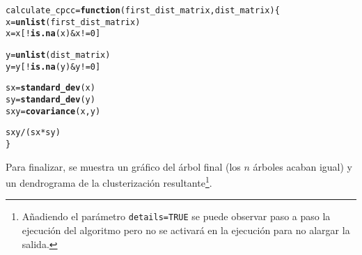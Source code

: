 \documentclass[12pt]{report}\usepackage[]{graphicx}\usepackage[dvipsnames]{xcolor}
\makeatletter
\newcommand{\hlnum}[1]{\textcolor[rgb]{0.686,0.059,0.569}{#1}}%
\newcommand{\hlopt}[1]{\textcolor[rgb]{0,0,0}{#1}}%
\newcommand{\hlstd}[1]{\textcolor[rgb]{0.345,0.345,0.345}{#1}}%
\newcommand{\hlkwa}[1]{\textcolor[rgb]{0.161,0.373,0.58}{\textbf{#1}}}%
\newcommand{\hlkwb}[1]{\textcolor[rgb]{0.69,0.353,0.396}{#1}}%
\newcommand{\hlkwc}[1]{\textcolor[rgb]{0.333,0.667,0.333}{#1}}%
\newcommand{\hlkwd}[1]{\textcolor[rgb]{0.737,0.353,0.396}{\textbf{#1}}}%
\newenvironment{kframe}{%
 \def\at@end@of@kframe{}%
 \ifinner\ifhmode%
  \def\at@end@of@kframe{\end{minipage}}%
  \begin{minipage}{\columnwidth}%
 \fi\fi%
 \def\FrameCommand##1{\hskip\@totalleftmargin \hskip-\fboxsep
 \colorbox{shadecolor}{##1}\hskip-\fboxsep
     \hskip-\linewidth \hskip-\@totalleftmargin \hskip\columnwidth}%
 \MakeFramed {\advance\hsize-\width
   \@totalleftmargin\z@ \linewidth\hsize
   \@setminipage}}%
 {\par\unskip\endMakeFramed%
 \at@end@of@kframe}
\newenvironment{knitrout}{}{} %
\makeatother
\begin{document}
\begin{knitrout}
\color{fgcolor}\begin{kframe}
\begin{alltt}
\hlstd{calculate_cpcc} \hlkwb{=} \hlkwa{function}\hlstd{(}\hlkwc{first_dist_matrix}\hlstd{,} \hlkwc{dist_matrix}\hlstd{) \{}
        \hlstd{x} \hlkwb{=} \hlkwd{unlist}\hlstd{(first_dist_matrix)}
        \hlstd{x} \hlkwb{=} \hlstd{x[}\hlopt{!}\hlkwd{is.na}\hlstd{(x)} \hlopt{&} \hlstd{x} \hlopt{!=} \hlnum{0}\hlstd{]}

        \hlstd{y} \hlkwb{=} \hlkwd{unlist}\hlstd{(dist_matrix)}
        \hlstd{y} \hlkwb{=} \hlstd{y[}\hlopt{!}\hlkwd{is.na}\hlstd{(y)} \hlopt{&} \hlstd{y} \hlopt{!=} \hlnum{0}\hlstd{]}

        \hlstd{sx} \hlkwb{=} \hlkwd{standard_dev}\hlstd{(x)}
        \hlstd{sy} \hlkwb{=} \hlkwd{standard_dev}\hlstd{(y)}
        \hlstd{sxy} \hlkwb{=} \hlkwd{covariance}\hlstd{(x, y)}

        \hlstd{sxy} \hlopt{/} \hlstd{(sx} \hlopt{*} \hlstd{sy)}
\hlstd{\}}
\end{alltt}
\end{kframe}
\end{knitrout}
		 		
		 		Para finalizar, se muestra un gráfico del árbol final (los $n$ árboles acaban igual) y un dendrograma de la clusterización resultante\footnote{Añadiendo el parámetro \texttt{details=TRUE} se puede observar paso a paso la ejecución del algoritmo pero no se activará en la ejecución para no alargar la salida. }. 
		 		
\end{document}

